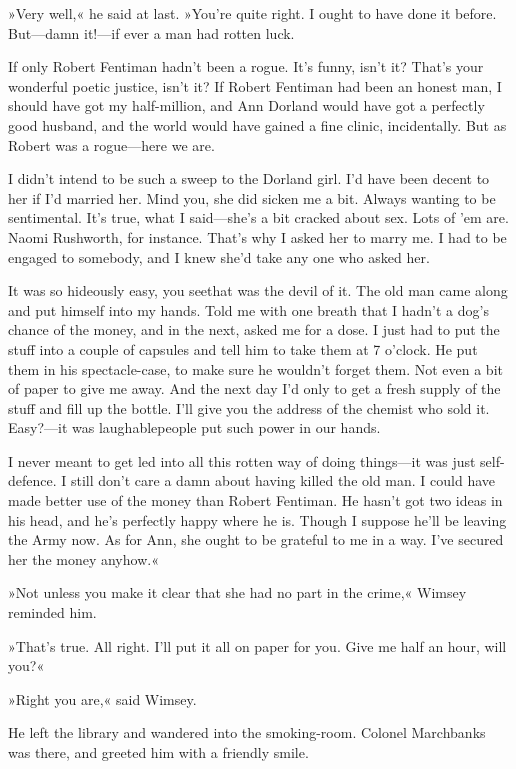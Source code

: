 »Very well,« he said at last. »You're quite right. I ought to have done it before. But—damn it!—if ever a man had rotten luck\textellipsis.

If only Robert Fentiman hadn't been a rogue. It's funny, isn't it? That's your wonderful poetic justice, isn't it? If Robert Fentiman had been an honest man, I should have got my half-million, and Ann Dorland would have got a perfectly good husband, and the world would have gained a fine clinic, incidentally. But as Robert was a rogue—here we are\textellipsis.

I didn't intend to be such a sweep to the Dorland girl. I'd have been decent to her if I'd married her. Mind you, she did sicken me a bit. Always wanting to be sentimental. It's true, what I said—she's a bit cracked about sex. Lots of 'em are. Naomi Rushworth, for instance. That's why I asked her to marry me. I had to be engaged to somebody, and I knew she'd take any one who asked her\textellipsis.

It was so hideously easy, you see\textellipsis that was the devil of it. The old man came along and put himself into my hands. Told me with one breath that I hadn't a dog's chance of the money, and in the next, asked me for a dose. I just had to put the stuff into a couple of capsules and tell him to take them at 7 o'clock. He put them in his spectacle-case, to make sure he wouldn't forget them. Not even a bit of paper to give me away. And the next day I'd only to get a fresh supply of the stuff and fill up the bottle. I'll give you the address of the chemist who sold it. Easy?—it was laughable\textellipsis people put such power in our hands\textellipsis .

I never meant to get led into all this rotten way of doing things—it was just self-defence. I still don't care a damn about having killed the old man. I could have made better use of the money than Robert Fentiman. He hasn't got two ideas in his head, and he's perfectly happy where he is. Though I suppose he'll be leaving the Army now\textellipsis . As for Ann, she ought to be grateful to me in a way. I've secured her the money anyhow.«

»Not unless you make it clear that she had no part in the crime,« Wimsey reminded him.

»That's true. All right. I'll put it all on paper for you. Give me half an hour, will you?«

»Right you are,« said Wimsey.

He left the library and wandered into the smoking-room. Colonel Marchbanks was there, and greeted him with a friendly smile.


